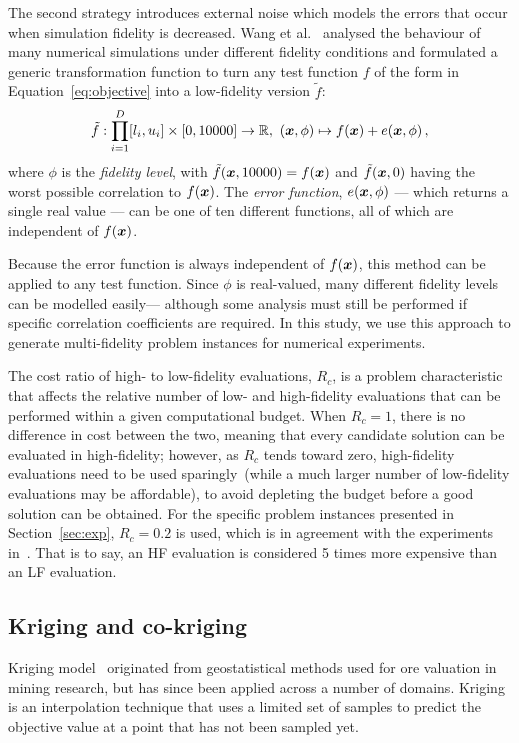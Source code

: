 The second strategy introduces external noise which models the errors that occur when simulation fidelity is decreased. Wang et al.~\cite{wang2017generic} analysed the behaviour of many numerical simulations under different fidelity conditions and formulated a generic transformation function to turn any test function $f$ of the form in Equation~\ref{eq:objective} into a low-fidelity version $\tilde f$:
\begin{equation}
\tilde f: \displaystyle\prod^D_{i=1}[l_i,u_i] \times [0,10000] \to \mathbb{R},\ (\V{x},\phi) \mapsto f(\V{x}) + e(\V{x},\phi)\,,\label{eq:error-fn}
\end{equation}
where $\phi$ is the \emph{fidelity level}, with $\tilde f(\boldsymbol{x},10000) = f(\boldsymbol{x})$ and $\tilde f(\boldsymbol{x},0)$ having the worst possible correlation to $f(\boldsymbol{x})$. The \emph{error function}, $e(\boldsymbol{x},\phi)$ --- which returns a single real value --- can be one of ten different functions, all of which are independent of $f(\boldsymbol{x})$.

Because the error function is always independent of $f(\boldsymbol{x})$, this method can be applied to any test function. Since $\phi$ is real-valued, many different fidelity levels can be modelled easily--- although some analysis must still be performed if specific correlation coefficients are required. In this study, we use this approach to generate multi-fidelity problem instances for numerical experiments. 

The cost ratio of high- to low-fidelity evaluations, $R_c$, is a problem characteristic that affects the relative number of low- and high-fidelity evaluations that can be performed within a given computational budget. When $R_c=1$, there is no difference in cost between the two, meaning that every candidate solution can be evaluated in high-fidelity; however, as $R_c$ tends toward zero, high-fidelity evaluations need to be used sparingly~(while a much larger number of low-fidelity evaluations may be affordable), to avoid depleting the budget before a good solution can be obtained. For the specific problem instances presented in Section~\ref{sec:exp}, $R_c=0.2$ is used, which is in agreement with the experiments in~\cite{lv2021multi}. That is to say, an HF evaluation is considered 5 times more expensive than an LF evaluation.

\subsection{Kriging and co-kriging}
Kriging model~\cite{forrester2008engineering} originated from geostatistical methods used for ore valuation in mining research, but has since been applied across a number of domains. Kriging is an interpolation technique that uses a limited set of samples to predict the objective value at a point that has not been sampled yet.

